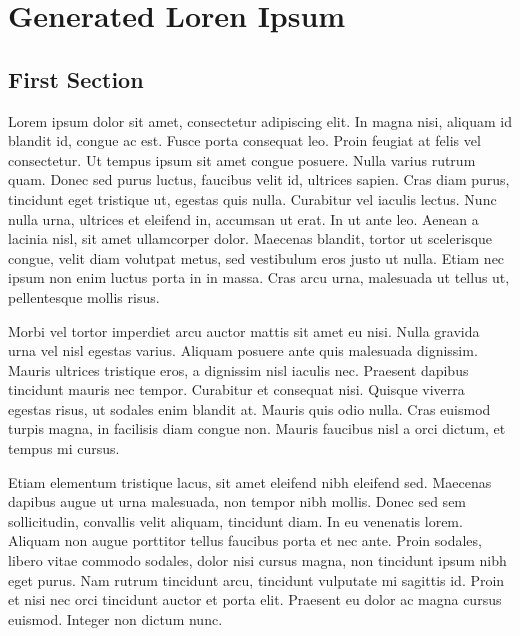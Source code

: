 \documentclass[openright]{book} %
\begin{document}

\chapter{Generated Loren Ipsum} %

\section{First Section} %

Lorem ipsum dolor sit amet, consectetur adipiscing elit. In magna nisi, aliquam id blandit id, congue ac est. Fusce porta consequat leo. Proin feugiat at felis vel consectetur. Ut tempus ipsum sit amet congue posuere. Nulla varius rutrum quam. Donec sed purus luctus, faucibus velit id, ultrices sapien. Cras diam purus, tincidunt eget tristique ut, egestas quis nulla. Curabitur vel iaculis lectus. Nunc nulla urna, ultrices et eleifend in, accumsan ut erat. In ut ante leo. Aenean a lacinia nisl, sit amet ullamcorper dolor. Maecenas blandit, tortor ut scelerisque congue, velit diam volutpat metus, sed vestibulum eros justo ut nulla. Etiam nec ipsum non enim luctus porta in in massa. Cras arcu urna, malesuada ut tellus ut, pellentesque mollis risus.

Morbi vel tortor imperdiet arcu auctor mattis sit amet eu nisi. Nulla gravida urna vel nisl egestas varius. Aliquam posuere ante quis malesuada dignissim. Mauris ultrices tristique eros, a dignissim nisl iaculis nec. Praesent dapibus tincidunt mauris nec tempor. Curabitur et consequat nisi. Quisque viverra egestas risus, ut sodales enim blandit at. Mauris quis odio nulla. Cras euismod turpis magna, in facilisis diam congue non. Mauris faucibus nisl a orci dictum, et tempus mi cursus.

Etiam elementum tristique lacus, sit amet eleifend nibh eleifend sed. Maecenas dapibus augue ut urna malesuada, non tempor nibh mollis. Donec sed sem sollicitudin, convallis velit aliquam, tincidunt diam. In eu venenatis lorem. Aliquam non augue porttitor tellus faucibus porta et nec ante. Proin sodales, libero vitae commodo sodales, dolor nisi cursus magna, non tincidunt ipsum nibh eget purus. Nam rutrum tincidunt arcu, tincidunt vulputate mi sagittis id. Proin et nisi nec orci tincidunt auctor et porta elit. Praesent eu dolor ac magna cursus euismod. Integer non dictum nunc.
\end{document}
